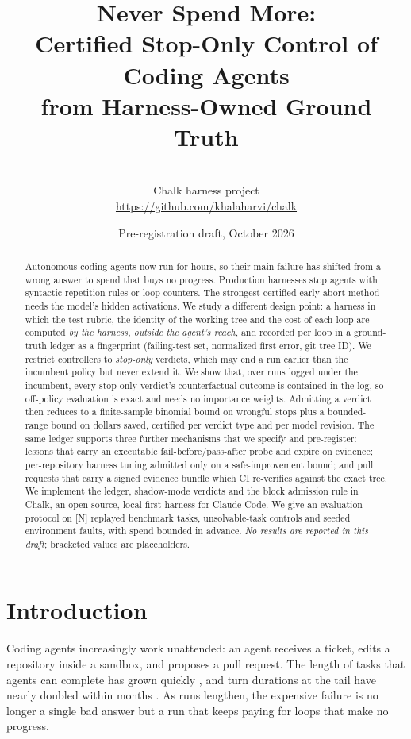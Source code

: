 \documentclass[11pt]{article}
\title{Never Spend More:\\Certified Stop-Only Control of Coding Agents\\from Harness-Owned Ground Truth}
\author{\tbd{Author name}\\Chalk harness project\\\url{https://github.com/khalaharvi/chalk}}
\date{Pre-registration draft, October 2026}
\theoremstyle{remark}
\newcommand{\tbd}[1]{\textcolor{red!70!black}{[#1]}}
\begin{document}
\maketitle

\begin{abstract}
Autonomous coding agents now run for hours, so their main failure has shifted from a wrong answer to spend that buys no progress. Production harnesses stop agents with syntactic repetition rules or loop counters. The strongest certified early-abort method needs the model's hidden activations. We study a different design point: a harness in which the test rubric, the identity of the working tree and the cost of each loop are computed \emph{by the harness, outside the agent's reach}, and recorded per loop in a ground-truth ledger as a fingerprint (failing-test set, normalized first error, git tree ID). We restrict controllers to \emph{stop-only} verdicts, which may end a run earlier than the incumbent policy but never extend it. We show that, over runs logged under the incumbent, every stop-only verdict's counterfactual outcome is contained in the log, so off-policy evaluation is exact and needs no importance weights. Admitting a verdict then reduces to a finite-sample binomial bound on wrongful stops plus a bounded-range bound on dollars saved, certified per verdict type and per model revision. The same ledger supports three further mechanisms that we specify and pre-register: lessons that carry an executable fail-before/pass-after probe and expire on evidence; per-repository harness tuning admitted only on a safe-improvement bound; and pull requests that carry a signed evidence bundle which CI re-verifies against the exact tree. We implement the ledger, shadow-mode verdicts and the block admission rule in Chalk, an open-source, local-first harness for Claude Code. We give an evaluation protocol on \tbd{N} replayed benchmark tasks, unsolvable-task controls and seeded environment faults, with spend bounded in advance. \emph{No results are reported in this draft}; bracketed values are placeholders.
\end{abstract}

\section{Introduction}
\label{sec:intro}

Coding agents increasingly work unattended: an agent receives a ticket, edits a repository inside a sandbox, and proposes a pull request. The length of tasks that agents can complete has grown quickly \citep{metr2025horizon}, and turn durations at the tail have nearly doubled within months \citep{anthropic2026autonomy}. As runs lengthen, the expensive failure is no longer a single bad answer but a run that keeps paying for loops that make no progress.
\end{document}
